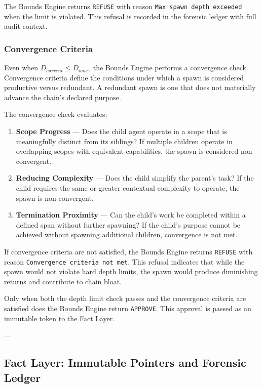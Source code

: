 The Bounds Engine returns \texttt{REFUSE} with reason \texttt{Max spawn depth exceeded} when the limit is violated. This refusal is recorded in the forensic ledger with full audit context.

\subsubsection{Convergence Criteria}

Even when $D_{current} \leq D_{max}$, the Bounds Engine performs a convergence check. Convergence criteria define the conditions under which a spawn is considered productive versus redundant. A redundant spawn is one that does not materially advance the chain's declared purpose.

The convergence check evaluates:

\begin{enumerate}
    \item \textbf{Scope Progress} — Does the child agent operate in a scope that is meaningfully distinct from its siblings? If multiple children operate in overlapping scopes with equivalent capabilities, the spawn is considered non-convergent.
    \item \textbf{Reducing Complexity} — Does the child simplify the parent's task? If the child requires the same or greater contextual complexity to operate, the spawn is non-convergent.
    \item \textbf{Termination Proximity} — Can the child's work be completed within a defined span without further spawning? If the child's purpose cannot be achieved without spawning additional children, convergence is not met.
\end{enumerate}

If convergence criteria are not satisfied, the Bounds Engine returns \texttt{REFUSE} with reason \texttt{Convergence criteria not met}. This refusal indicates that while the spawn would not violate hard depth limits, the spawn would produce diminishing returns and contribute to chain bloat.

Only when both the depth limit check passes and the convergence criteria are satisfied does the Bounds Engine return \texttt{APPROVE}. This approval is passed as an immutable token to the Fact Layer.

---

\subsection{Fact Layer: Immutable Pointers and Forensic Ledger}

